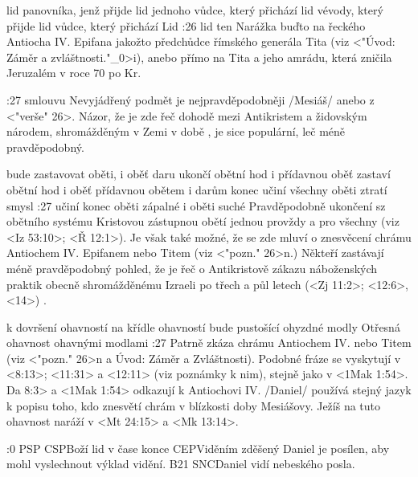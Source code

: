     {lid panovníka, jenž přijde}   %
    {lid jednoho vůdce, který přichází}   %
    {lid vévody, který přijde}   %
    {lid vůdce, který přichází}   %
    {Lid}   %
:26 {lid ten} Narážka buďto na řeckého Antiocha IV. Epifana jakožto předchůdce římského generála Tita (viz <"Úvod: Záměr a zvláštnosti."_0>i), anebo přímo na Tita a jeho amrádu, která zničila Jeruzalém v roce 70 po Kr.

:27 {smlouvu} Nevyjádřený podmět  je nejpravděpodobněji \x/Mesiáš/ anebo  z <"verše" 26>. Názor, že je zde řeč dohodě mezi Antikristem a židovským národem, shromážděným v Zemi v době , je sice populární, leč méně pravděpodobný.

 {bude zastavovat oběti, i oběť daru} {ukončí obětní hod i přídavnou oběť} {zastaví obětní hod i oběť přídavnou} {obětem i darům konec učiní} {všechny oběti ztratí smysl}
:27 {učiní konec oběti zápalné i oběti suché} Pravděpodobně ukončení sz obětního systému Kristovou zástupnou obětí jednou provždy a pro všechny (viz <Iz 53:10>; <Ř 12:1>).
Je však také možné, že se zde mluví o znesvěcení chrámu  Antiochem IV. Epifanem nebo Titem (viz <"pozn." 26>n.) Někteří zastávají méně pravděpodobný pohled, že je řeč o Antikristově zákazu náboženských praktik obecně shromážděnému Izraeli po třech a půl letech (<Zj 11:2>; <12:6>, <14>)  .

    {k dovršení ohavností}   %
    {na křídle ohavností bude pustošící}   %
    {ohyzdné modly}   %
    {Otřesná ohavnost}   %
    {ohavnými modlami}   %
:27 {} Patrně zkáza chrámu Antiochem IV. nebo Titem (viz <"pozn." 26>n a Úvod: Záměr a Zvláštnosti). Podobné fráze se vyskytují v <8:13>; <11:31> a <12:11> (viz poznámky k nim), stejně jako v <1Mak 1:54>. \<Da 8:3> a <1Mak 1:54> odkazují k Antiochovi IV. \x/Daniel/ používá stejný jazyk k popisu toho, kdo znesvětí chrám v blízkosti doby Mesiášovy. Ježíš na tuto ohavnost naráží v <Mt 24:15> a <Mk 13:14>.

:0 {} 
% 
        {PSP}{}%
        {CSP}{Boží lid v čase konce}%
        {CEP}{Viděním zděšený Daniel je posílen, aby mohl vyslechnout výklad vidění.}%
        {B21}{}%
        {SNC}{Daniel vidí nebeského posla.}%

